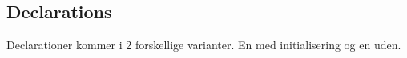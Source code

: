 \noindent \subsection{Declarations}
Declarationer kommer i 2 forskellige varianter. En med initialisering og en uden.